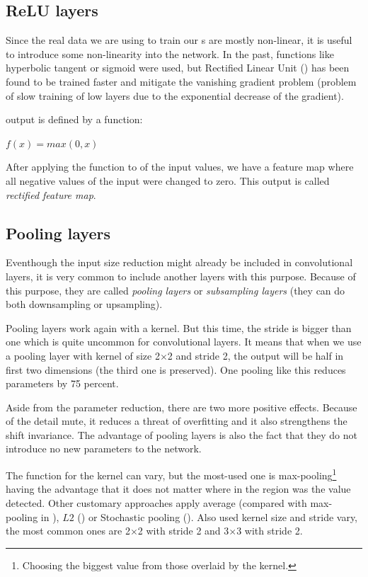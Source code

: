 \subsection{ReLU layers}
\label{relu-layers}

Since the real data we are using to train our s are mostly non-linear, it is useful to introduce some non-linearity into the network. In the past, functions like hyperbolic tangent or sigmoid were used, but Rectified Linear Unit () has been found to be trained faster and mitigate the vanishing gradient problem (problem of slow training of low layers due to the exponential decrease of the gradient). 

 output is defined by a function:

$f(x) = max(0, x)$

After applying the  function to of the input values, we have a feature map where all negative values of the input were changed to zero. This output is called \textit{rectified feature map}. 

\subsection{Pooling layers}
\label{pooling}

Eventhough the input size reduction might already be included in convolutional layers, it is very common to include another layers with this purpose. Because of this purpose, they are called \textit{pooling layers} or \textit{subsampling layers} (they can do both downsampling or upsampling). 

Pooling layers work again with a kernel. But this time, the stride is bigger than one which is quite uncommon for convolutional layers. It means that when we use a pooling layer with kernel of size 2$\times$2 and stride 2, the output will be half in first two dimensions (the third one is preserved). One pooling like this reduces parameters by 75 percent. 

Aside from the parameter reduction, there are two more positive effects. Because of the detail mute, it reduces a threat of overfitting and it also strengthens the shift invariance. The advantage of pooling layers is also the fact that they do not introduce no new parameters to the network. 

The function for the kernel can vary, but the most-used one is max-pooling\footnote{Choosing the biggest value from those overlaid by the kernel.} having the advantage that it does not matter where in the region was the value detected. Other customary approaches apply average (compared with max-pooling in \cite{avg-pooling}), $L2$ (\cite{l2-pooling}) or Stochastic pooling (\cite{stoch-pooling}). Also used kernel size and stride vary, the most common ones are 2$\times$2 with stride 2 and 3$\times$3 with stride 2. 

